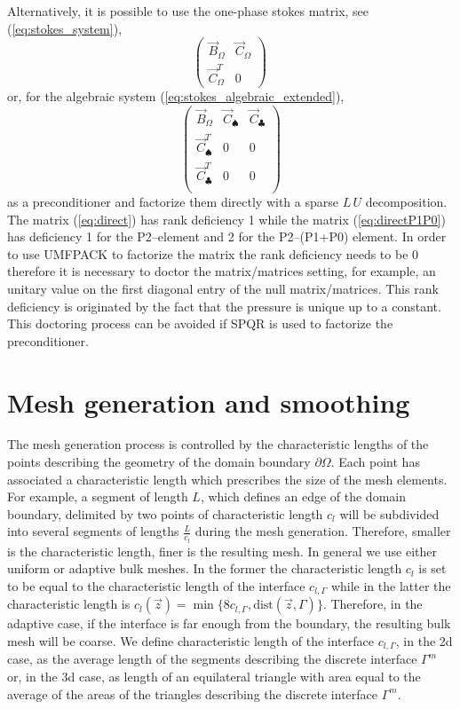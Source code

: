 Alternatively, it is possible to use the one-phase stokes matrix, see
(\ref{eq:stokes_system}),
\begin{equation}\label{eq:direct}
\begin{pmatrix}
\vec B_\Omega & \vec C_\Omega \\
\vec C_\Omega^T & 0
\end{pmatrix}\,
\end{equation}
or, for the algebraic system (\ref{eq:stokes_algebraic_extended}),
\begin{equation}\label{eq:directP1P0}
\begin{pmatrix}
\vec B_\Omega & \vec C_\spadesuit & \vec C_\clubsuit \\
\vec C^T_\spadesuit & 0 & 0 \\
\vec C^T_\clubsuit & 0 & 0 \\
\end{pmatrix}
\end{equation}
as a preconditioner and factorize them directly with a sparse $L\,U$
decomposition. The matrix (\ref{eq:direct}) has rank deficiency 1 while the
matrix (\ref{eq:directP1P0}) has deficiency 1 for the P2--\pdg element and 2 for
the P2--(P1+P0) element. In order to use UMFPACK to factorize the matrix the
rank deficiency needs to be 0 therefore it is necessary to doctor the
matrix/matrices setting, for example, an unitary value on the first diagonal
entry of the null matrix/matrices. This rank deficiency is originated by the
fact that the pressure is unique up to a constant. This doctoring process can be
avoided if SPQR is used to factorize the preconditioner.

\section{Mesh generation and smoothing}\label{sec:stokes_smoothing}
The mesh generation process is controlled by the characteristic lengths of the
points describing the geometry of the domain boundary $\partial\Omega$. Each
point has associated a characteristic length which prescribes the size of the
mesh elements. For example, a segment of length $L$, which defines an edge of
the domain boundary, delimited by two points of characteristic length $c_l$ will
be subdivided into several segments of lengths $\frac{L}{c_l}$ during the mesh
generation. Therefore, smaller is the characteristic length, finer is the
resulting mesh. In general we use either uniform or adaptive bulk meshes. In the
former the characteristic length $c_l$ is set to be equal to the characteristic
length of the interface $c_{l,\Gamma}$ while in the latter the characteristic
length is $c_l(\vec z)=\min\{8c_{l,\Gamma},\mbox{dist}(\vec z,\Gamma)\}$.
Therefore, in the adaptive case, if the interface is far enough from the
boundary, the resulting bulk mesh will be coarse. We define characteristic
length of the interface $c_{l,\Gamma}$, in the 2d case, as the average length
of the segments describing the discrete interface $\Gamma^m$ or, in the 3d case,
as length of an equilateral triangle with area equal to the average of the
areas of the triangles describing the discrete interface $\Gamma^m$.

